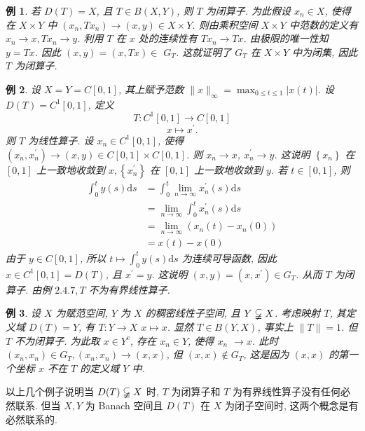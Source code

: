 \documentclass[openany]{ctexbook}
\theoremstyle{kaiti}
\theoremstyle{normal}
\newtheorem{example}{例}[section]
\begin{document}
\begin{example}
若 $D(T)=X$, 且 $T \in B(X, Y)$, 则 $T$ 为闭算子. 为此假设 $x_n \in X$, 使得在 $X \times Y$ 中 $\left(x_n, T x_n\right) \rightarrow(x, y) \in X \times Y$. 则由乘积空间 $X \times Y$ 中范数的定义有 $x_n \rightarrow x, T x_n \rightarrow y$. 利用 $T$ 在 $x$ 处的连续性有 $T x_n \rightarrow T x$. 由极限的唯一性知 $y=T x$. 因此 $(x, y)=(x, T x) \in$ $G_{T}$. 这就证明了 $G_{T}$ 在 $X \times Y$ 中为闭集, 因此 $T$ 为闭算子.
\end{example}

\begin{example}
设 $X=Y=C[0,1]$, 其上赋予范数 $\|x\|_{\infty}=\max_{0 \leqslant t \leqslant 1}|x(t)|$. 设 $D(T)=C^1[0,1]$, 定义
$$
T: C^1[0,1] \rightarrow C[0,1]
$$
$$
x \mapsto x^{\prime}.
$$
则 $T$ 为线性算子. 设 $x_n \in C^1[0,1]$, 使得 $\left(x_n, x_n^{\prime}\right) \rightarrow(x, y) \in C[0,1] \times C[0,1]$. 则 $x_n \rightarrow x$, $x_n^{\prime} \rightarrow y$. 这说明 $\left\{x_n\right\}$ 在 $[0,1]$ 上一致地收敛到 $x,\left\{x_n^{\prime}\right\}$ 在 $[0,1]$ 上一致地收敛到 $y$. 若 $t \in[0,1]$, 则
$$
\begin{aligned}
\int_0^{t} y(s) \mathrm{d} s &=\int_0^{t} \lim_{n \rightarrow \infty} x_n^{\prime}(s) \mathrm{d} s \\
&=\lim_{n \rightarrow \infty} \int_0^{t} x_n^{\prime}(s) \mathrm{d} s \\
&=\lim_{n \rightarrow \infty}\left(x_n(t)-x_n(0)\right) \\
&=x(t)-x(0)
\end{aligned}
$$
由于 $y \in C[0,1]$, 所以 $t \mapsto \int_0^{t} y(s) \mathrm{d} s$ 为连续可导函数, 因此 $x \in C^1[0,1]=D(T)$, 且 $x^{\prime}=y$. 这说明 $(x, y)=\left(x, x^{\prime}\right) \in G_{T}$. 从而 $T$ 为闭算子. 由例 $2.4.7, T$ 不为有界线性算子.
\end{example}

\begin{example}
设 $X$ 为赋范空间, $Y$ 为 $X$ 的稠密线性子空间, 且 $Y \varsubsetneqq X$. 考虑映射 $T$, 其定义域 $D(T)=Y$, 有
$T: Y \rightarrow X$
$x \mapsto x$.
显然 $T \in B(Y, X)$, 事实上 $\|T\|=1$. 但 $T$ 不为闭算子. 为此取 $x \in Y^{c}$, 存在 $x_n \in Y$, 使得 $x_n$ $\rightarrow x$. 此时 $\left(x_n, x_n\right) \in G_{T},\left(x_n, x_n\right) \rightarrow(x, x)$, 但 $(x, x) \notin G_{T}$, 这是因为 $(x, x)$ 的第一个坐标 $x$ 不在 $T$ 的定义域 $Y$ 中.
\end{example}

以上几个例子说明当 $D(T) \varsubsetneqq X$ 时, $T$ 为闭算子和 $T$ 为有界线性算子没有任何必然联系. 但当 $X, Y$ 为 Banach 空间且 $D(T)$ 在 $X$ 为闭子空间时, 这两个概念是有必然联系的.
\end{document}
